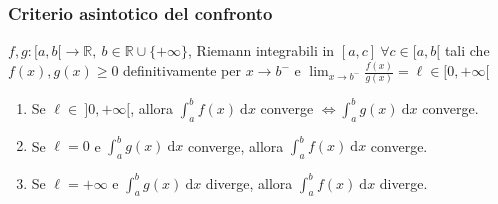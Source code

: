 \subsubsection{Criterio asintotico del confronto}
\begin{theorem}
	\label{th:criterio asintotico confronto integrale}
	$f,g: [a,b[\rightarrow \mathbb{R}, \ b \in \mathbb{R} \cup \{+\infty\}$, Riemann integrabili in $[a,c] \ \forall c \in [a,b[$ tali che $f(x),g(x)\geq 0$ definitivamente per $x \rightarrow b^-$ e $\lim_{x \rightarrow b^-} \frac{f(x)}{g(x)}= \ell \in [0,+\infty[$
	\begin{enumerate}
		\item Se $\ell \in \ ]0,+\infty[$, allora $ \int_{a}^{b} f(x) \ \mathrm{d}x$ converge $\iff \int_{a}^{b} g(x) \ \mathrm{d}x$ converge.
		
		\item Se $\ell=0$ e $\int_{a}^{b} g(x) \ \mathrm{d}x $ converge, allora $\int_{a}^{b} f(x) \ \mathrm{d}x$ converge.
		
		\item Se $\ell=+\infty$ e $\int_{a}^{b} g(x) \ \mathrm{d}x$ diverge, allora $\int_{a}^{b} f(x) \ \mathrm{d}x$ diverge.
	\end{enumerate}
\end{theorem}



